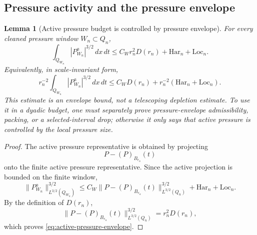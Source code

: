\documentclass[11pt]{article}
\numberwithin{equation}{section}
\theoremstyle{plain}
\newtheorem{lemma}[theorem]{Lemma}
\theoremstyle{definition}
\theoremstyle{remark}
\newcommand{\Har}{\mathrm{Har}}
\newcommand{\Loc}{\mathrm{Loc}}
\begin{document}
\subsection{Pressure activity and the pressure envelope}

\begin{lemma}[Active pressure budget is controlled by pressure envelope]
\label{lem:active-pressure-envelope}
For every cleaned pressure window \(W_n\subset Q_n\),
\begin{equation}
        \int_{Q_{W_n}}|P^a_{W_n}|^{3/2}\,dx\,dt
        \le
        C_W r_n^2D(r_n)+\Har_n+\Loc_n.
        \label{eq:active-pressure-envelope}
\end{equation}
Equivalently, in scale-invariant form,
\[
        r_n^{-2}\int_{Q_{W_n}}|P^a_{W_n}|^{3/2}\,dx\,dt
        \le
        C_WD(r_n)+r_n^{-2}(\Har_n+\Loc_n).
\]
This estimate is an envelope bound, not a telescoping depletion estimate.  To use it in a dyadic budget, one must separately prove pressure-envelope admissibility, packing, or a selected-interval drop; otherwise it only says that active pressure is controlled by the local pressure size.
\end{lemma}

\begin{proof}
The active pressure representative is obtained by projecting
\[
        P-(P)_{B_{r_n}}(t)
\]
onto the finite active pressure representative.  Since the active projection is bounded on the finite window,
\[
        \|P^a_{W_n}\|_{L^{3/2}(Q_{W_n})}^{3/2}
        \le
        C_W\|P-(P)_{B_{r_n}}(t)\|_{L^{3/2}(Q_n)}^{3/2}
        +
        \Har_n+\Loc_n.
\]
By the definition of \(D(r_n)\),
\[
        \|P-(P)_{B_{r_n}}(t)\|_{L^{3/2}(Q_n)}^{3/2}
        =
        r_n^2D(r_n),
\]
which proves \eqref{eq:active-pressure-envelope}.
\end{proof}
\end{document}
